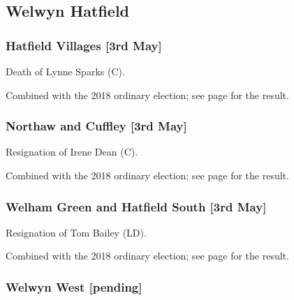 \documentclass[a4paper,openany]{book}
\begin{document}
\begin{resultsiii}
\subsection*{Welwyn Hatfield}

\subsubsection*{Hatfield Villages \hspace*{\fill}\nolinebreak[1]%
\enspace\hspace*{\fill}
[3rd May]}


Death of Lynne Sparks (C).

Combined with the 2018 ordinary election; see page \pageref{HatfieldVillagesWelwynHatfield} for the result.

\subsubsection*{Northaw and Cuffley \hspace*{\fill}\nolinebreak[1]%
\enspace\hspace*{\fill}
[3rd May]}


Resignation of Irene Dean (C).

Combined with the 2018 ordinary election; see page \pageref{NorthawCuffleyWelwynHatfield} for the result.

\subsubsection*{Welham Green and Hatfield South \hspace*{\fill}\nolinebreak[1]%
\enspace\hspace*{\fill}
[3rd May]}


Resignation of Tom Bailey (LD).

Combined with the 2018 ordinary election; see page \pageref{WelhamGreenHatfieldSouthWelwynHatfield} for the result.

\subsubsection*{Welwyn West \hspace*{\fill}\nolinebreak[1]%
	\enspace\hspace*{\fill}
	[pending]}


\end{resultsiii}
\end{document}
